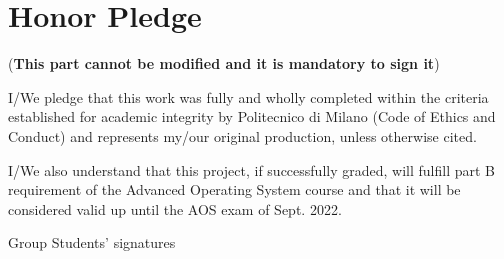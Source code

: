 \documentclass[10pt,a4]{article}
\begin{document}
\section{Honor Pledge}
(\textbf{This part cannot be modified and it is mandatory to sign it})

I/We pledge that this work was fully and wholly completed within the criteria
established for academic integrity by Politecnico di Milano (Code of Ethics and
Conduct) and represents my/our original production, unless otherwise cited.

I/We also understand that this project, if successfully graded,  will fulfill part B requirement of the
Advanced Operating System course and that it will be considered valid up until
the AOS exam of Sept. 2022. 

\begin{flushright}
Group Students' signatures
\end{flushright}
\end{document}
